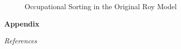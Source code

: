 \begin{frame}
\begin{figure}[htp]\centering
\caption{Occupational Sorting in the Original Roy Model}\label{Occupational Sorting in the Original Roy Model}
\end{figure}
\end{frame}

\beginbackup\appendix
\begin{frame}\begin{center}
\LARGE\textbf{Appendix}
\end{center}\end{frame}

\begin{frame}\begin{center}
\LARGE\textit{References}
\end{center}\end{frame}
\begin{frame}[allowframebreaks]\frametitle{}

\nocite{Carneiro.2011, Heckman.1990c, Heckman.2010h}





\end{frame}

\backupend

